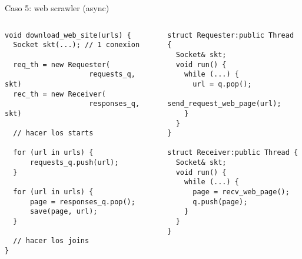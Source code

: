 \begin{frame}{}
\end{frame}

\begin{frame}[fragile]{Caso 5: web scrawler (async)}{}
    \begin{columns}[T]
      \begin{column}{.55\linewidth}
\begin{lstlisting}[style=normalnonumbers]
void download_web_site(urls) {
  Socket skt(...); // 1 conexion

  req_th = new Requester(
                    requests_q, skt)
  rec_th = new Receiver(
                    responses_q, skt)

  // hacer los starts

  for (url in urls) {
      requests_q.push(url);
  }

  for (url in urls) {
      page = responses_q.pop();
      save(page, url);
  }

  // hacer los joins
}
\end{lstlisting}
      \end{column}
      \begin{column}{.50\linewidth}
\begin{lstlisting}[style=normalnonumbers]
struct Requester:public Thread {
  Socket& skt;
  void run() {
    while (...) {
      url = q.pop();
      send_request_web_page(url);
    }
  }
}

struct Receiver:public Thread {
  Socket& skt;
  void run() {
    while (...) {
      page = recv_web_page();
      q.push(page);
    }
  }
}
\end{lstlisting}
      \end{column}
    \end{columns}

\end{frame}
